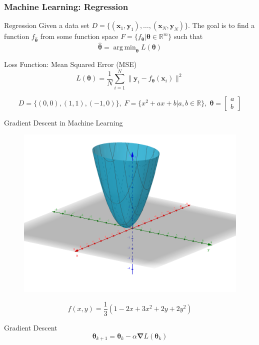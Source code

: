 \documentclass{beamer}
\DeclareMathOperator*{\argmin}{arg\,min}
\begin{document}
\begin{frame}
    \frametitle{Machine Learning: Regression}

    \begin{block}{Regression}
        Given a data set $D = \{(\boldsymbol{x}_1, \boldsymbol{y}_1), \dots, (\boldsymbol{x}_N, \boldsymbol{y}_N)\}$. The goal is to find a function $f_{\hat{\boldsymbol{\theta}}}$ from some function space $F = \{f_{\boldsymbol{\theta}} \vert \boldsymbol{\theta} \in \mathbb{R}^m\}$ such that
        \[\hat{\boldsymbol{\theta}} = \argmin_{\boldsymbol{\theta}} L(\boldsymbol{\theta})\]
    \end{block}
    
    \begin{block}{Loss Function: Mean Squared Error (MSE)}
        \[L(\boldsymbol{\theta}) = \frac{1}{N}\sum_{i = 1}^{N} \lVert\boldsymbol{y}_i - f_{\boldsymbol{\theta}}(\boldsymbol{x}_i)\rVert^2\]
    \end{block}

    \[D = \{(0, 0), (1, 1), (-1, 0)\},\; F = \{x^2 + ax + b \vert a, b \in \mathbb{R}\}, \;\boldsymbol{\theta} = \begin{bmatrix}
        a \\
        b
    \end{bmatrix}\]

\end{frame}

\begin{frame}{Gradient Descent in Machine Learning}

\begin{example}
    \begin{figure}
        \includegraphics[height=.35\paperheight]{res/func3d.png}
    \end{figure}
    \[f(x, y) = \frac{1}{3}(1 - 2x + 3x^2 + 2y + 2y^2)\]
\end{example}

\begin{block}{Gradient Descent}
    \[\boldsymbol{\theta}_{k + 1} = \boldsymbol{\theta}_{k} - \alpha\boldsymbol{\nabla} L(\boldsymbol{\theta}_{k})\]
\end{block}

\end{frame}
\end{document}
